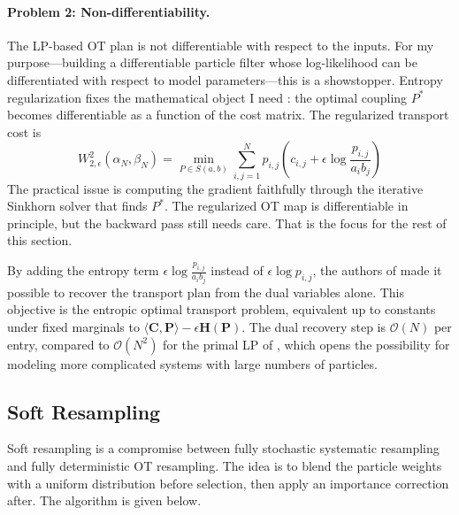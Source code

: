 \documentclass{article}
\begin{document}
\paragraph{Problem 2: Non-differentiability.} The LP-based OT plan is not differentiable with respect to the inputs. For my purpose---building a differentiable particle filter whose log-likelihood can be differentiated with respect to model parameters---this is a showstopper. Entropy regularization fixes the mathematical object I need \cite{corenflos-differentiable-2021}: the optimal coupling $P^*$ becomes differentiable as a function of the cost matrix. The regularized transport cost is
\begin{equation}
    W_{2, \epsilon}^2 (\alpha_N, \beta_N) = \min_{P \in S(a, b)} \sum_{i,j=1}^N p_{i,j} \left( c_{i,j} + \epsilon \log \frac{p_{i,j}}{a_i b_j} \right)
\end{equation}
The practical issue is computing the gradient faithfully through the iterative Sinkhorn solver that finds $P^*$. The regularized OT map is differentiable in principle, but the backward pass still needs care. That is the focus for the rest of this section.

By adding the entropy term $\epsilon \log \frac{p_{i,j}}{a_i b_j}$ instead of $\epsilon \log p_{i,j}$, the authors of \cite{corenflos-differentiable-2021} made it possible to recover the transport plan from the dual variables alone. This objective is the entropic optimal transport problem, equivalent up to constants under fixed marginals to $\langle \mathbf{C}, \mathbf{P}\rangle - \epsilon \mathbf{H}(\mathbf{P})$. The dual recovery step is $\mathcal{O}(N)$ per entry, compared to $\mathcal{O}(N^2)$ for the primal LP of \cite{reich2013nonparametric}, which opens the possibility for modeling more complicated systems with large numbers of particles.
\subsection{Soft Resampling}

Soft resampling \cite{karkus2018particle} is a compromise between fully stochastic systematic resampling and fully deterministic OT resampling. The idea is to blend the particle weights with a uniform distribution before selection, then apply an importance correction after. The algorithm is given below.
\end{document}
